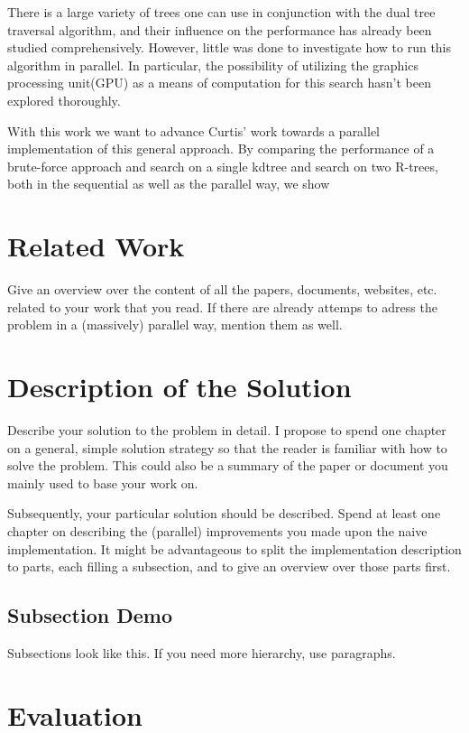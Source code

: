 \documentclass{utue} %
\begin{document}
There is a large variety of trees one can use in conjunction with the dual tree traversal algorithm, and their influence on the performance has already been studied comprehensively. However, little was done to investigate how to run this algorithm in parallel. In particular, the possibility of utilizing the graphics processing unit(GPU) as a means of computation for this search hasn't been explored thoroughly.

With this work we want to advance Curtis' work \cite{improving} towards a parallel implementation of this general approach. By comparing the performance of a brute-force approach and search on a single kdtree and search on two R-trees, both in the sequential as well as the parallel way, we show 
\section{Related Work} 

Give an overview over the content of all the papers, documents, websites, etc. related to your work that you read. If there are already attemps to adress the problem in a (massively) parallel way, mention them as well.


\section{Description of the Solution}

Describe your solution to the problem in detail. I propose to spend one chapter on a general, simple solution strategy so that the reader is familiar with how to solve the problem. This could also be a summary of the paper or document you mainly used to base your work on.

Subsequently, your particular solution should be described. Spend at least one chapter on describing the (parallel) improvements you made upon the naive implementation. It might be advantageous to split the implementation description to parts, each filling a subsection, and to give an overview over those parts first.

\subsection{Subsection Demo}

Subsections look like this. If you need more hierarchy, use paragraphs.


\section{Evaluation}
\end{document}
